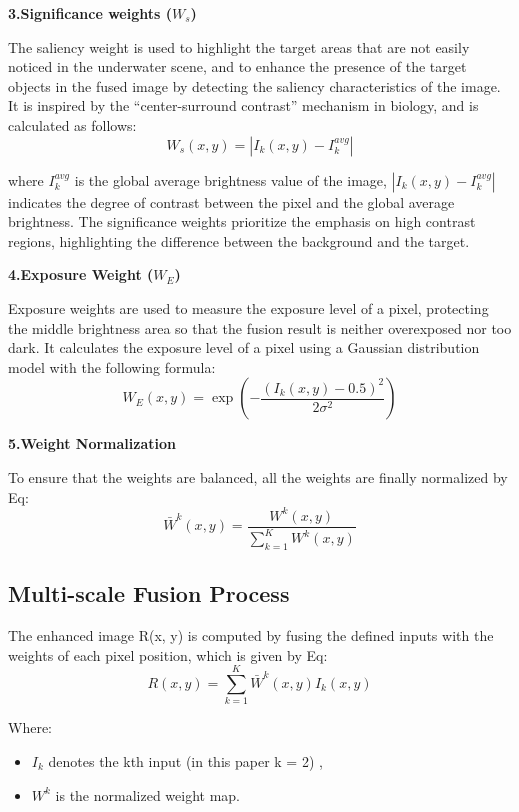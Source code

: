 \documentclass[withoutpreface,bwprint]{cumcmthesis}
\begin{document}
\vspace{0.5em}
\textbf{3.Significance weights ($W_{s}$)}

The saliency weight is used to highlight the target areas that are not easily noticed in the underwater scene, and to enhance the presence of the target objects in the fused image by detecting the saliency characteristics of the image. It is inspired by the “center-surround contrast” mechanism in biology, and is calculated as follows:
\[W_{s}(x, y) = \left| I_{k}(x, y) - I_{k}^{avg} \right| \]

where $I_{k}^{avg}$ is the global average brightness value of the image, $\left| I_{k}(x, y) - I_{k}^{avg} \right|$ indicates the degree of contrast between the pixel and the global average brightness. The significance weights prioritize the emphasis on high contrast regions, highlighting the difference between the background and the target.

\vspace{0.5em}
\textbf{4.Exposure Weight ($W_{E}$)}

Exposure weights are used to measure the exposure level of a pixel, protecting the middle brightness area so that the fusion result is neither overexposed nor too dark. It calculates the exposure level of a pixel using a Gaussian distribution model with the following formula:
\[W_E(x, y) = \exp\left(-\frac{(I_k(x, y) - 0.5)^2}{2\sigma^2}\right)\]

\vspace{0.5em}
\textbf{5.Weight Normalization}

To ensure that the weights are balanced, all the weights are finally normalized by Eq:
\[\bar{W}^k(x, y) = \frac{W^k(x, y)}{\sum_{k=1}^{K} W^k(x, y)}\]

\subsection{Multi-scale Fusion Process}

The enhanced image R(x, y) is computed by fusing the defined inputs with the weights of each pixel position, which is given by Eq:
\[R(x, y) = \sum_{k=1}^{K} \bar{W}^k(x, y) I_k(x, y)\]

Where:

\begin{itemize}[itemindent=2em]
    \item $I_{k}$ denotes the kth input (in this paper k = 2) ,

    \item ${W}^k$ is the normalized weight map.
\end{itemize}
\end{document}
